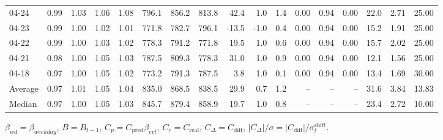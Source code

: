 \begin{threeparttable}
{\begin{tabular}{lrrrrrrrrrrrrrrrr}
  04-24 &         0.99 &           1.03 &          1.06 &          1.08 & 796.1 & 856.2 & 813.8 &       42.4 &                      1.0 &                 1.4 &       0.00 &      0.94 &           0.00 &             22.0 &            2.71 &                  25.00 \\
  04-23 &         0.99 &           1.00 &          1.02 &          1.01 & 771.8 & 782.7 & 796.1 &      -13.5 &                     -1.0 &                 0.4 &       0.00 &      0.94 &           0.00 &             15.2 &            1.91 &                  25.00 \\
  04-22 &         0.99 &           1.00 &          1.03 &          1.02 & 778.3 & 791.2 & 771.8 &       19.5 &                      1.0 &                 0.6 &       0.00 &      0.94 &           0.00 &             15.7 &            2.02 &                  25.00 \\
  04-21 &         0.98 &           1.00 &          1.05 &          1.03 & 787.5 & 809.3 & 778.3 &       31.0 &                      1.0 &                 0.9 &       0.00 &      0.94 &           0.00 &             12.1 &            1.56 &                  25.00 \\
  04-18 &         0.97 &           1.00 &          1.05 &          1.02 & 773.2 & 791.3 & 787.5 &        3.8 &                      1.0 &                 0.1 &       0.00 &      0.94 &           0.00 &             13.4 &            1.69 &                  30.00 \\
Average &         0.97 &           1.01 &          1.05 &          1.04 & 835.0 & 868.5 & 838.5 &       29.9 &                      0.7 &                 1.2 &         -- &        -- &             -- &             31.6 &            3.84 &                  13.83 \\
 Median &         0.97 &           1.00 &          1.05 &          1.03 & 845.7 & 879.4 & 858.9 &       19.7 &                      1.0 &                 0.8 &         -- &        -- &             -- &             23.4 &            2.72 &                  10.00 \\
\bottomrule
\end{tabular}
}
\begin{tablenotes}\footnotesize
\item $\beta_{wd}=\beta_{weekday}$, $B=B_{t-1}$,
$C_p=C_{\text{pred}}\beta_{evt}$, $C_r=C_{\text{real}}$,
$C_\Delta=C_{\text{diff}}$, $|C_\Delta|/\sigma=|C_{\text{diff}}|/\sigma_t^{\text{shift}}$.
\end{tablenotes}
\end{threeparttable}
\endgroup
